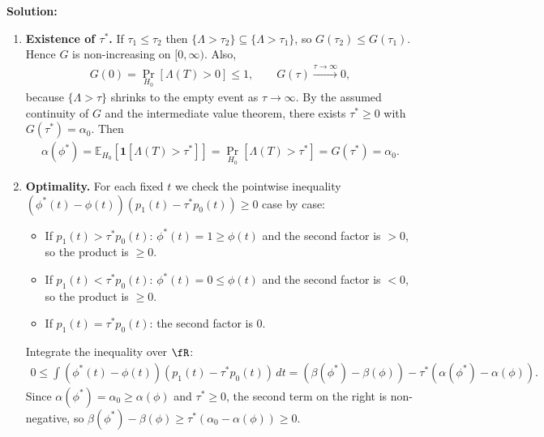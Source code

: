 \documentclass[12pt]{article}
\renewcommand{\fE}{\mathbb{E}}
\begin{document}
\begin{enumerate}
\begin{solution}
{\bf Solution:}\\
\begin{enumerate}
    \item \textbf{Existence of $\tau^*$.} If $\tau_1 \le \tau_2$ then $\{\Lambda > \tau_2\} \subseteq \{\Lambda > \tau_1\}$, so $G(\tau_2) \le G(\tau_1)$. Hence $G$ is non-increasing on $[0, \infty)$. Also,
    \begin{align*}
        G(0) = \Pr_{H_0}[\Lambda(T) > 0] \le 1, \qquad G(\tau) \xrightarrow{\tau \to \infty} 0,
    \end{align*}
    because $\{\Lambda > \tau\}$ shrinks to the empty event as $\tau \to \infty$. By the assumed continuity of $G$ and the intermediate value theorem, there exists $\tau^* \ge 0$ with $G(\tau^*) = \alpha_0$. Then
    \begin{align*}
        \alpha(\phi^*) = \fE_{H_0}[\mathbf{1}[\Lambda(T) > \tau^*]] = \Pr_{H_0}[\Lambda(T) > \tau^*] = G(\tau^*) = \alpha_0.
    \end{align*}

    \item \textbf{Optimality.} For each fixed $t$ we check the pointwise inequality $(\phi^*(t) - \phi(t))(p_1(t) - \tau^* p_0(t)) \ge 0$ case by case:
    \begin{itemize}
        \item If $p_1(t) > \tau^* p_0(t)$: $\phi^*(t) = 1 \ge \phi(t)$ and the second factor is $> 0$, so the product is $\ge 0$.
        \item If $p_1(t) < \tau^* p_0(t)$: $\phi^*(t) = 0 \le \phi(t)$ and the second factor is $< 0$, so the product is $\ge 0$.
        \item If $p_1(t) = \tau^* p_0(t)$: the second factor is $0$.
    \end{itemize}
    Integrate the inequality over $\fR$:
    \begin{align*}
        0 \le \int (\phi^*(t) - \phi(t))(p_1(t) - \tau^* p_0(t))\, dt = (\beta(\phi^*) - \beta(\phi)) - \tau^*(\alpha(\phi^*) - \alpha(\phi)).
    \end{align*}
    Since $\alpha(\phi^*) = \alpha_0 \ge \alpha(\phi)$ and $\tau^* \ge 0$, the second term on the right is non-negative, so $\beta(\phi^*) - \beta(\phi) \ge \tau^*(\alpha_0 - \alpha(\phi)) \ge 0$.


\end{enumerate}
\end{solution}
\end{enumerate}
\end{document}
